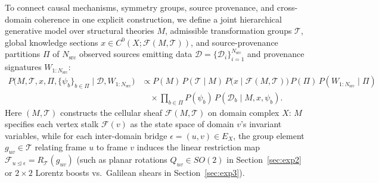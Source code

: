 \documentclass[11pt,a4paper]{article}
\theoremstyle{definition}
\theoremstyle{remark}
\begin{document}
To connect causal mechanisms, symmetry groups, source provenance, and cross-domain coherence in one explicit construction, we define a joint hierarchical generative model over structural theories $M$, admissible transformation groups $\mathcal{T}$, global knowledge sections $x \in C^0(X;\mathcal{F}(M,\mathcal{T}))$, and source-provenance partitions $\Pi$ of $N_{\mathrm{src}}$ observed sources emitting data $\mathcal{D} = \{\mathcal{D}_i\}_{i=1}^{N_{\mathrm{src}}}$ and provenance signatures $W_{1:N_{\mathrm{src}}}$:
\begin{equation}
  \begin{aligned}
    P\bigl(M, \mathcal{T}, x, \Pi, \{\psi_b\}_{b \in \Pi} \mid \mathcal{D}, W_{1:N_{\mathrm{src}}}\bigr)
    &\propto P(M) \, P(\mathcal{T} \mid M) \, P\bigl(x \mid \mathcal{F}(M, \mathcal{T})\bigr) \, P(\Pi) \, P(W_{1:N_{\mathrm{src}}} \mid \Pi) \\
    &\quad \times \prod_{b \in \Pi} P(\psi_b) \, P(\mathcal{D}_b \mid M, x, \psi_b).
  \end{aligned}
  \label{eq:unified_joint}
\end{equation}
Here $(M, \mathcal{T})$ constructs the cellular sheaf $\mathcal{F}(M, \mathcal{T})$ on domain complex $X$: $M$ specifies each vertex stalk $\mathcal{F}(v)$ as the state space of domain $v$'s invariant variables, while for each inter-domain bridge $\epsilon = (u, v) \in E_X$, the group element $g_{uv} \in \mathcal{T}$ relating frame $u$ to frame $v$ induces the linear restriction map $\mathcal{F}_{u \trianglelefteq \epsilon} = R_{\mathcal{T}}(g_{uv})$ (such as planar rotations $Q_{uv} \in SO(2)$ in Section~\ref{sec:exp2} or $2 \times 2$ Lorentz boosts vs.\ Galilean shears in Section~\ref{sec:exp3}).
\end{document}
